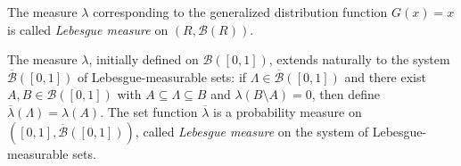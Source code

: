 The measure $\lambda$ corresponding to the generalized distribution function $G(x) = x$ is called \textit{Lebesgue measure} on $(R, \mathcal{B}(R))$.

The measure $\lambda$, initially defined on $\mathcal{B}([0,1])$, extends naturally to the system $\overline{\mathcal{B}}([0,1])$ of Lebesgue-measurable sets: if $\Lambda \in \overline{\mathcal{B}}([0,1])$ and there exist $A, B \in \mathcal{B}([0,1])$ with $A \subseteq \Lambda \subseteq B$ and $\lambda(B \setminus A) = 0$, then define $\overline{\lambda}(\Lambda) = \lambda(A)$. The set function $\overline{\lambda}$ is a probability measure on $([0,1], \overline{\mathcal{B}}([0,1]))$, called \textit{Lebesgue measure} on the system of Lebesgue-measurable sets.
